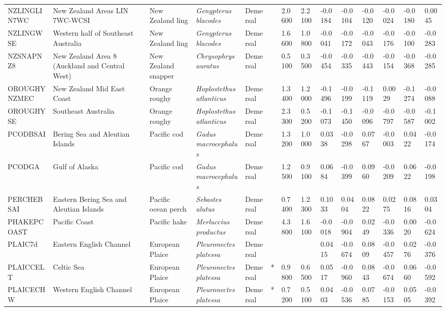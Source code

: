 \begin{longtable}{p{2.6cm}p{1.9cm}p{1.7cm}p{1.6cm}p{1cm}p{0.3cm}p{1cm}p{1cm}p{1cm}p{1.1cm}p{1cm}p{1.1cm}p{1cm}p{1.1cm}}
  NZLINGLIN7WC & New Zealand Areas LIN 7WC-WCSI & New Zealand ling & \textit{Genypterus blacodes} & Demersal &   & 2.0600 & 2.2100 & -0.0184 & -0.0104 & -0.0120 & -0.0024 & -0.0180 & 0.0045 \\ 
  NZLINGWSE & Western half of Southeast Australia & New Zealand ling & \textit{Genypterus blacodes} & Demersal &   & 1.6600 & 1.0800 & -0.0041 & -0.0172 & -0.0043 & -0.0176 & -0.0100 & -0.0283 \\ 
  NZSNAPNZ8 & New Zealand Area 8 (Auckland and Central West) & New Zealand snapper & \textit{Chrysophrys auratus} & Demersal &   & 0.5100 & 0.3500 & -0.0454 & -0.0335 & -0.0443 & -0.0154 & -0.0368 & -0.0285 \\ 
  OROUGHYNZMEC & New Zealand Mid East Coast & Orange roughy & \textit{Hoplostethus atlanticus} & Demersal &   & 1.3400 & 1.2000 & -0.1496 & -0.0199 & -0.1119 & 0.0029 & -0.1274 & -0.0088 \\ 
  OROUGHYSE & Southeast Australia & Orange roughy & \textit{Hoplostethus atlanticus} & Demersal &   & 2.3300 & 0.5200 & -0.1073 & -0.1450 & -0.0096 & -0.0797 & -0.0587 & -0.1002 \\ 
  PCODBSAI & Bering Sea and Aleutian Islands & Pacific cod & \textit{Gadus macrocephalus} & Demersal &   & 1.3200 & 1.0000 & 0.0338 & -0.0298 & 0.0767 & -0.0003 & 0.0422 & -0.0174 \\ 
  PCODGA & Gulf of Alaska & Pacific cod & \textit{Gadus macrocephalus} & Demersal &   & 1.2500 & 0.9100 & 0.0684 & -0.0399 & 0.0960 & -0.0209 & 0.0622 & -0.0198 \\ 
  PERCHEBSAI & Eastern Bering Sea and Aleutian Islands & Pacific ocean perch & \textit{Sebastes alutus} & Demersal &   & 0.7400 & 1.2300 & 0.1033 & 0.0404 & 0.0822 & 0.0275 & 0.0816 & 0.0304 \\ 
  PHAKEPCOAST & Pacific Coast & Pacific hake & \textit{Merluccius productus} & Demersal &   & 4.3800 & 1.6100 & -0.0018 & -0.0904 & 0.0249 & -0.0336 & 0.0020 & -0.0624 \\ 
  PLAIC7d & Eastern English Channel & European Plaice & \textit{Pleuronectes platessa} & Demersal &  &  &  & 0.0415 & -0.0674 & 0.0809 & -0.0457 & 0.0276 & -0.0376 \\ 
  PLAICCELT & Celtic Sea & European Plaice & \textit{Pleuronectes platessa} & Demersal & * & 0.9800 & 0.6500 & 0.0517 & -0.0960 & 0.0843 & -0.0674 & 0.0660 & -0.0592 \\ 
  PLAICECHW & Western English Channel & European Plaice & \textit{Pleuronectes platessa} & Demersal & * & 0.7200 & 0.5100 & 0.0403 & -0.0536 & 0.0785 & -0.0153 & 0.0505 & -0.0392 \\ 

\end{longtable}
